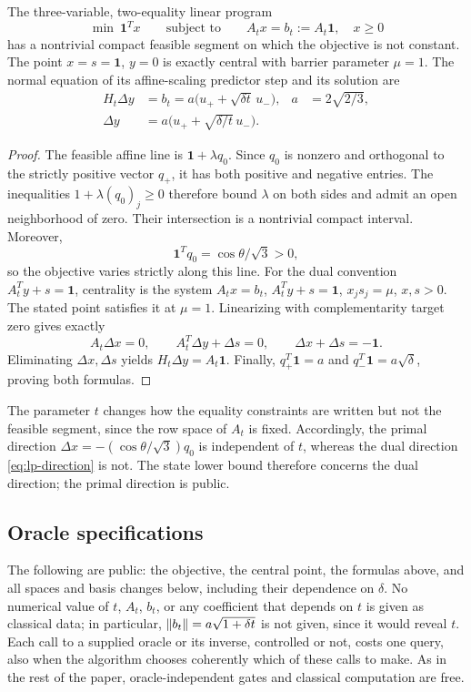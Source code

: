 \begin{proposition}\label{prop:lp-center}
The three-variable, two-equality linear program
\begin{equation}\label{eq:lp-primal}
 \min\ \mathbf1^Tx\qquad\text{subject to}\qquad
 A_tx=b_t:=A_t\mathbf1,\quad x\geq0
\end{equation}
has a nontrivial compact feasible segment on which the objective is not constant. The point $x=s=\mathbf1$, $y=0$ is exactly central with barrier parameter $\mu=1$. The normal equation of its affine-scaling predictor step and its solution are
\begin{align}
 H_t\Delta y&=b_t=a\bigl(u_++\sqrt{\delta t}\,u_-\bigr),
 &a&=2\sqrt{2/3},\label{eq:lp-normal}\\
 \Delta y&=a\bigl(u_++\sqrt{\delta/t}\,u_-\bigr).
 \label{eq:lp-direction}
\end{align}
\end{proposition}
\begin{proof}
The feasible affine line is $\mathbf1+\lambda q_0$. Since $q_0$ is nonzero and orthogonal to the strictly positive vector $q_+$, it has both positive and negative entries. The inequalities $1+\lambda(q_0)_j\geq0$ therefore bound $\lambda$ on both sides and admit an open neighborhood of zero. Their intersection is a nontrivial compact interval. Moreover,
\[
 \mathbf1^Tq_0=\cos\theta/\sqrt3>0,
\]
so the objective varies strictly along this line.
For the dual convention $A_t^Ty+s=\mathbf1$, centrality is the system
$A_tx=b_t$, $A_t^Ty+s=\mathbf1$, $x_js_j=\mu$, $x,s>0$.
The stated point satisfies it at $\mu=1$. Linearizing with complementarity target zero gives exactly
\[
 A_t\Delta x=0,\qquad A_t^T\Delta y+\Delta s=0,
 \qquad\Delta x+\Delta s=-\mathbf1.
\]
Eliminating $\Delta x,\Delta s$ yields $H_t\Delta y=A_t\mathbf1$. Finally,
$q_+^T\mathbf1=a$ and $q_-^T\mathbf1=a\sqrt\delta$, proving both formulas.
\end{proof}
The parameter $t$ changes how the equality constraints are written but not the feasible segment, since the row space of $A_t$ is fixed. Accordingly, the primal direction $\Delta x=-(\cos\theta/\sqrt3)q_0$ is independent of $t$, whereas the dual direction \eqref{eq:lp-direction} is not. The state lower bound therefore concerns the dual direction; the primal direction is public.

\subsection{Oracle specifications}
The following are public: the objective, the central point, the formulas above, and all spaces and basis changes below, including their dependence on $\delta$. No numerical value of $t$, $A_t$, $b_t$, or any coefficient that depends on $t$ is given as classical data; in particular, $\left\lVert b_t\right\rVert=a\sqrt{1+\delta t}$ is not given, since it would reveal $t$. Each call to a supplied oracle or its inverse, controlled or not, costs one query, also when the algorithm chooses coherently which of these calls to make. As in the rest of the paper, oracle-independent gates and classical computation are free.


